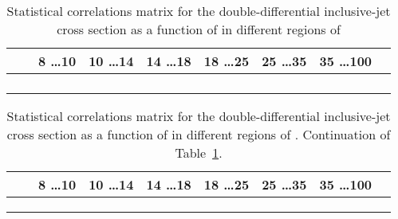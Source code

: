\clearpage
\begin{table}[p!]
	\centering
		\begin{tabular}{cc|ccccccc}
		  \hline
			& & 8 \dots 10     & 10 \dots 14    & 14 \dots 18    &  18 \dots 25    &  25 \dots 35    & 35 \dots 100  &  \\
			\hline   \\ \hline
			
			\hline  \\ \hline 
			
			\hline  \\ \hline
			
			\hline  \\ 
			\end{tabular}
			\caption{Statistical correlations matrix for the double-differential inclusive-jet cross section as a function of \etjetb in different regions of \qsq}
	\label{tab:StatisticalCorrelationsMatrix_part1}
			\end{table}
			
			\newpage
			
			\begin{table}[p!]
			\centering
			\begin{tabular}{cc|ccccccc}
		  \hline
			& & 8 \dots 10     & 10 \dots 14    & 14 \dots 18    &  18 \dots 25    &  25 \dots 35    & 35 \dots 100  &  \\
			\hline   \\ \hline
			
			\hline  \\ \hline
			
			\hline  \\ \hline 
			
			\hline
		\end{tabular}
		
	\caption{Statistical correlations matrix for the double-differential inclusive-jet cross section as a function of \etjetb in different regions of \qsq. Continuation of Table~\ref{tab:StatisticalCorrelationsMatrix_part1}.}
	\label{tab:StatisticalCorrelationsMatrix_part2}
	\end{table}
